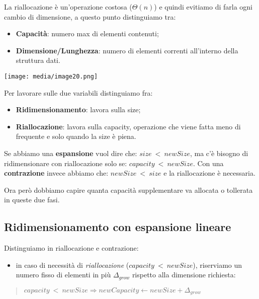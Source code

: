 La riallocazione è un'operazione costosa (\(\Theta(n)\)) e quindi
evitiamo di farla ogni cambio di dimensione, a questo punto distinguiamo
tra:

\begin{itemize}
\item
  \textbf{Capacità}: numero max di elementi contenuti;
\item
  \textbf{Dimensione/Lunghezza}: numero di elementi correnti all'interno
  della struttura dati.
\end{itemize}

\texttt{[image: media/image20.png]}

Per lavorare sulle due variabili distinguiamo fra:

\begin{itemize}
\item
  \textbf{Ridimensionamento}: lavora sulla size;
\item
  \textbf{Riallocazione}: lavora sulla capacity, operazione che viene
  fatta meno di frequente e solo quando la size è piena.
\end{itemize}

Se abbiamo una \textbf{espansione} vuol dire che:
\(size\  < \ newSize\), ma c'è bisogno di ridimensionare con
riallocazione solo se: \(capacity\  < \ newSize\). Con una
\textbf{contrazione} invece abbiamo che: \(newSize\  < \ size\) e la
riallocazione è necessaria.

Ora però dobbiamo capire quanta capacità supplementare va allocata o
tollerata in queste due fasi.

\subsection{Ridimensionamento con espansione
lineare}\label{ridimensionamento-con-espansione-lineare}

Distinguiamo in riallocazione e contrazione:

\begin{itemize}
\item
  in caso di necessità di \emph{riallocazione}
  (\(capacity\  < \ newSize\)), riserviamo un numero fisso di elementi
  in più \(\Delta_{grow}\) rispetto alla dimensione richiesta:
\end{itemize}

\begin{quote}
\(capacity\  < \ newSize \Rightarrow newCapacity \leftarrow newSize + \Delta_{grow}\)
\end{quote}

